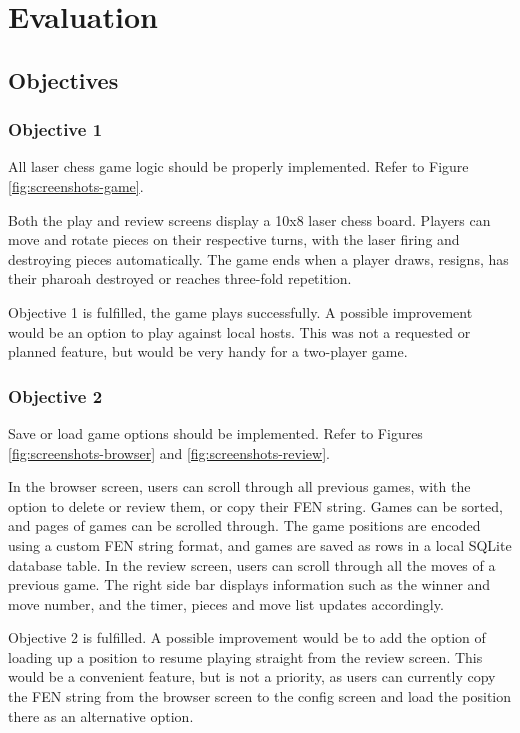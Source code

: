 \documentclass[../main/main.tex]{subfiles}
\begin{document}
\newpage
\chapter{Evaluation}
\section{Objectives}
\subsection{Objective 1}
All laser chess game logic should be properly implemented. Refer to Figure \ref{fig:screenshots-game}.

Both the play and review screens display a 10x8 laser chess board. Players can move and rotate pieces on their respective turns, with the laser firing and destroying pieces automatically. The game ends when a player draws, resigns, has their pharoah destroyed or reaches three-fold repetition.

Objective 1 is fulfilled, the game plays successfully. A possible improvement would be an option to play against local hosts. This was not a requested or planned feature, but would be very handy for a two-player game.

\subsection{Objective 2}
Save or load game options should be implemented. Refer to Figures \ref{fig:screenshots-browser} and \ref{fig:screenshots-review}.

In the browser screen, users can scroll through all previous games, with the option to delete or review them, or copy their FEN string. Games can be sorted, and pages of games can be scrolled through. The game positions are encoded using a custom FEN string format, and games are saved as rows in a local SQLite database table. In the review screen, users can scroll through all the moves of a previous game. The right side bar displays information such as the winner and move number, and the timer, pieces and move list updates accordingly.

Objective 2 is fulfilled. A possible improvement would be to add the option of loading up a position to resume playing straight from the review screen. This would be a convenient feature, but is not a priority, as users can currently copy the FEN string from the browser screen to the config screen and load the position there as an alternative option.
\end{document}
